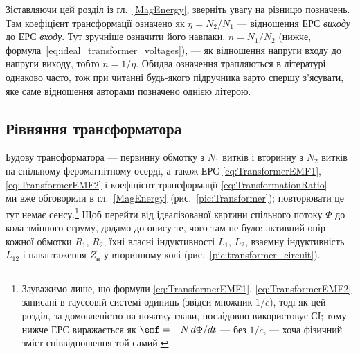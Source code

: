 \begin{Attention}
	Зіставляючи цей розділ із гл.~\ref{MagEnergy}, зверніть увагу
	на різницю позначень. Там коефіцієнт трансформації означено
	як $\eta = N_2/N_1$ --- відношення ЕРС \emph{виходу} до ЕРС
	\emph{входу}. Тут зручніше означити його навпаки, $n =
	N_1/N_2$ (нижче, формула~\eqref{eq:ideal_transformer_voltages}),
	--- як відношення напруги входу до напруги виходу, тобто
	$n = 1/\eta$. Обидва означення трапляються в літературі
	однаково часто, тож при читанні будь-якого підручника варто
	спершу з'ясувати, яке саме відношення авторами позначено
	однією літерою.
\end{Attention}

\subsection*{Рівняння трансформатора}

Будову трансформатора --- первинну обмотку з $N_1$ витків і
вторинну з $N_2$ витків на спільному феромагнітному осерді, а
також ЕРС \eqref{eq:TransformerEMF1}, \eqref{eq:TransformerEMF2}
і коефіцієнт трансформації \eqref{eq:TransformationRatio} --- ми
вже обговорили в гл.~\ref{MagEnergy} (рис.~\ref{pic:Transformer});
повторювати це тут немає сенсу.\footnote{Зауважимо лише, що
формули \eqref{eq:TransformerEMF1}, \eqref{eq:TransformerEMF2}
записані в гауссовій системі одиниць (звідси множник $1/c$), тоді
як цей розділ, за домовленістю на початку глави, послідовно
використовує СІ; тому нижче ЕРС виражається як $\emf=-N\,d\Phi/dt$
--- без $1/c$, --- хоча фізичний зміст співвідношення той самий.}
Щоб перейти від ідеалізованої картини спільного потоку $\Phi$ до
кола змінного струму, додамо до опису те, чого там не було:
активний опір кожної обмотки $R_1$, $R_2$, їхні власні
індуктивності $L_1$, $L_2$, взаємну індуктивність $L_{12}$ і
навантаження $Z_{\text{н}}$ у вторинному колі (рис.~\ref{pic:transformer_circuit}).

